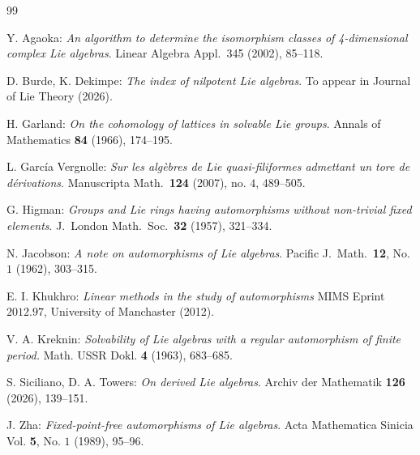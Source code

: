 \documentclass[12pt]{amsart}
\theoremstyle{definition}
\theoremstyle{remark}
\begin{document}
\begin{thebibliography}{99}


 Y. Agaoka: {\em An algorithm to determine the isomorphism classes of
4-dimensional complex Lie algebras}.  Linear Algebra Appl.\  345  (2002), 85--118.

 D. Burde, K. Dekimpe: {\em The index of nilpotent Lie algebras}.
To appear in Journal of Lie Theory (2026).
  
 H. Garland: {\em On the cohomology of lattices in solvable Lie groups}.
Annals of Mathematics \textbf{84} (1966), 174--195.

 L. Garc\'ia Vergnolle: {\em Sur les alg\`ebres de Lie quasi-filiformes admettant un tore de d\'erivations}.
Manuscripta Math.\ \textbf{124} (2007), no. $4$, 489--505.
  
 G. Higman: {\em Groups and Lie rings having automorphisms without non-trivial fixed elements}.
J.\ London Math.\ Soc.\ \textbf{32} (1957), 321--334.

 N. Jacobson: {\em A note on automorphisms of Lie algebras}.
Pacific J.\ Math.\ \textbf{12}, No. $1$ (1962), 303--315.

 E. I. Khukhro: {\em Linear methods in the study of automorphisms}
MIMS Eprint $2012.97$, University of Manchaster (2012).
  
 V. A. Kreknin: {\em Solvability of Lie algebras with a regular automorphism of finite period.}
Math. USSR Dokl. \textbf{4} (1963), 683--685.

 S. Siciliano, D. A. Towers: {\em On derived Lie algebras}.
Archiv der Mathematik \textbf{126} (2026), 139--151.  

 J. Zha: {\em Fixed-point-free automorphisms of Lie algebras}.
Acta Mathematica Sinicia Vol. \textbf{5}, No. $1$ (1989), 95--96.





\end{thebibliography}
\end{document}

